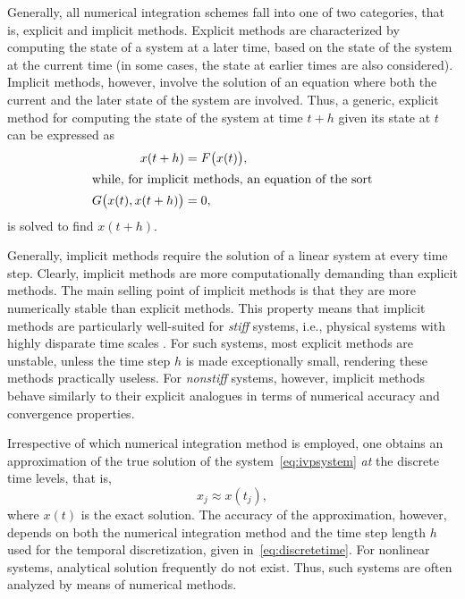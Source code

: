 Generally, all numerical integration schemes fall into one of two categories,
that is, explicit and implicit methods. Explicit methods are characterized
by computing the state of a system at a later time, based on the state of
the system at the current time (in some cases, the state at earlier times
are also considered). Implicit methods, however, involve the solution of
an equation where both the current and the later state of the system are
involved. Thus, a generic, explicit method for computing the state of the
system at time $t+h$ given its state at $t$ can be expressed as
\begin{subequations}
    \label{eq:exim}
    \begin{align}
    \label{eq:exim_ex}
    x(t+h) &= F\big(x(t)\big),\\
    \intertext{while, for implicit methods, an equation of the sort}
    \label{eq:exim_im}
    G\big(x(t),x(t+h)\big)&=0,
    \end{align}
\end{subequations}
is solved to find $x(t+h)$.

Generally, implicit methods require the solution of a linear system at every
time step. Clearly, implicit methods are more computationally demanding than
explicit methods. The main selling point of implicit methods is that they
are more numerically stable than explicit methods. This property means that
implicit methods are particularly well-suited for \emph{stiff} systems, i.e.,
physical systems with highly disparate time scales
\parencite[p.2]{hairer1996solving}. For such systems, most explicit methods
are unstable, unless the time step $h$ is made exceptionally small, rendering
these methods practically useless. For \emph{nonstiff} systems, however,
implicit methods behave similarly to their explicit analogues in terms of
numerical accuracy and convergence properties.

Irrespective of which numerical integration method is employed, one obtains
an approximation of the true solution of the system~\eqref{eq:ivpsystem}
\emph{at} the discrete time levels, that is,
\begin{equation}
    \label{eq:numericalintegratorapproximatesolution}
    x_{j} \approx x(t_{j}),
\end{equation}
where $x(t)$ is the exact solution. The accuracy of the approximation, however,
depends on both the numerical integration method and the time step length $h$
used for the temporal discretization, given in~\cref{eq:discretetime}.
For nonlinear systems, analytical solution frequently do not exist. Thus,
such systems are often analyzed by means of numerical methods.
